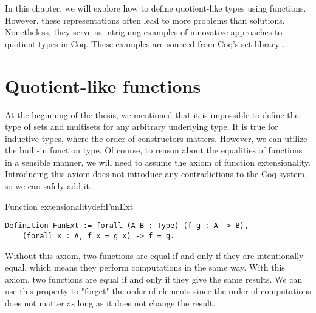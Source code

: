 In this chapter, we will explore how to define quotient-like types using functions. However, these representations often lead to more problems than solutions. Nonetheless, they serve as intriguing examples of innovative approaches to quotient types in Coq. These examples are sourced from Coq's set library \cite{coqDoc}. %
\section{Quotient-like functions}
At the beginning of the thesis, we mentioned that it is impossible to define the type of sets and multisets for any arbitrary underlying type. It is true for inductive types, where the order of constructors matters. However, we can utilize the built-in function type. Of course, to reason about the equalities of functions in a sensible manner, we will need to assume the axiom of function extensionality. Introducing this axiom does not introduce any contradictions to the Coq system, so we can safely add it.
\begin{defi}{Function extensionality}{def:FunExt}
\begin{verbatim}
Definition FunExt := forall (A B : Type) (f g : A -> B),
    (forall x : A, f x = g x) -> f = g.
\end{verbatim}
\end{defi}
Without this axiom, two functions are equal if and only if they are intentionally equal, which means they perform computations in the same way. With this axiom, two functions are equal if and only if they give the same results. We can use this property to "forget" the order of elements since the order of computations does not matter as long as it does not change the result.
